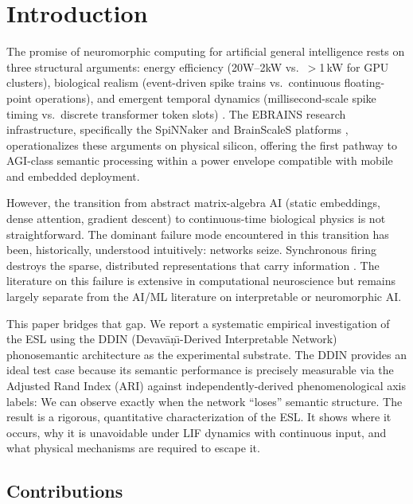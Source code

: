 \documentclass{article}
\begin{document}
\vspace{1em}

\section{Introduction}

The promise of neuromorphic computing for artificial general intelligence rests on three structural arguments: energy efficiency (20W--2kW vs.\ $>$1\,kW for GPU clusters), biological realism (event-driven spike trains vs.\ continuous floating-point operations), and emergent temporal dynamics (millisecond-scale spike timing vs.\ discrete transformer token slots) \citep{furber2014, mahowald1991}. The EBRAINS research infrastructure, specifically the SpiNNaker and BrainScaleS platforms \citep{furber2014, schemmel2010}, operationalizes these arguments on physical silicon, offering the first pathway to AGI-class semantic processing within a power envelope compatible with mobile and embedded deployment.

However, the transition from abstract matrix-algebra AI (static embeddings, dense attention, gradient descent) to continuous-time biological physics is not straightforward. The dominant failure mode encountered in this transition has been, historically, understood intuitively: networks seize. Synchronous firing destroys the sparse, distributed representations that carry information \citep{brunel2000}. The literature on this failure is extensive in computational neuroscience \citep{vogel2005, amit1997} but remains largely separate from the AI/ML literature on interpretable or neuromorphic AI.

This paper bridges that gap. We report a systematic empirical investigation of the ESL using the DDIN (Devav\={a}\d{n}\={\i}-Derived Interpretable Network) phonosemantic architecture \citep{kumar2026ddin, kumar2026phonosemantic} as the experimental substrate. The DDIN provides an ideal test case because its semantic performance is precisely measurable via the Adjusted Rand Index (ARI) against independently-derived phenomenological axis labels: We can observe exactly when the network “loses” semantic structure. The result is a rigorous, quantitative characterization of the ESL. It shows where it occurs, why it is unavoidable under LIF dynamics with continuous input, and what physical mechanisms are required to escape it.

\subsection{Contributions}
\end{document}
